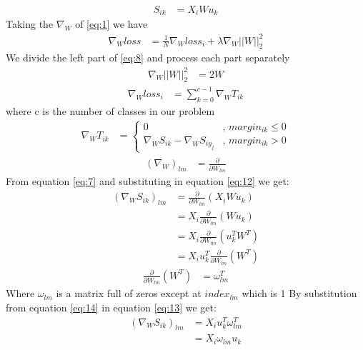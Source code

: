 \documentclass[]{article}
\begin{document}
\begin{align}
	S_{ik} &= X_{i} W u_{k} \label{eq:7}
\end{align}
Taking the $\nabla_W$ of \eqref{eq:1} we have
\begin{align}
	\nabla_W loss &= \frac{1}{N} \nabla_W loss_i + \lambda \nabla_W ||W||_{2}^{2} \label{eq:8}
\end{align}
We divide the left part of \eqref{eq:8} and process each part separately
\begin{align}
	\nabla_W ||W||_{2}^{2} &= 2 W \label{eq:9}
\end{align}
\begin{align}
	\nabla_W loss_i &= \sum_{k=0}^{c-1} \nabla_W T_{ik}
\end{align}
where c is the number of classes in our problem
\begin{align}
	\nabla_W T_{ik}	&= \begin{cases}
	0 & \text{, $margin_{ik} \le 0$} \\
	\nabla_W S_{ik} - \nabla_W S_{i y_j} & \text{, $margin_{ik} > 0$}
	\end{cases}
\end{align}
\begin{align}
	{\left( \nabla_W \right)}_{lm} &= \frac{ \partial }{\partial W_{lm}} \label{eq:12}
\end{align}
From equation \eqref{eq:7} and substituting in equation \eqref{eq:12} we get:  
\begin{align}
	{\left( \nabla_W S_{ik} \right)}_{lm} &= \frac{ \partial }{\partial W_{lm}} \left( X_i W u_k\right) \nonumber  \\
	&= X_i \frac{\partial}{\partial W_{lm}} \left( W u_k \right) \nonumber \\
	&= X_i \frac{\partial}{\partial W_{lm}} \left( u^T_k W^T \right) \nonumber \\
	&= X_i u^T_k \frac{\partial}{\partial W_{lm}} \left(  W^T \right) \label{eq:13}
\end{align}
\begin{align}
	\frac{\partial}{\partial W_{lm}} \left(  W^T \right) &= \omega^{T}_{lm} \label{eq:14}
\end{align}
Where $\omega_{lm}$ is a matrix full of zeros except at $index_{lm}$ which is 1
By substitution from equation \eqref{eq:14} in equation \eqref{eq:13} we get:
\begin{align}
{\left( \nabla_W S_{ik} \right)}_{lm} &= X_i u^T_k \omega^T_{lm} \nonumber \\  
& = X_i \omega_{lm} u_k \label{eq:15}
\end{align}
\end{document}
